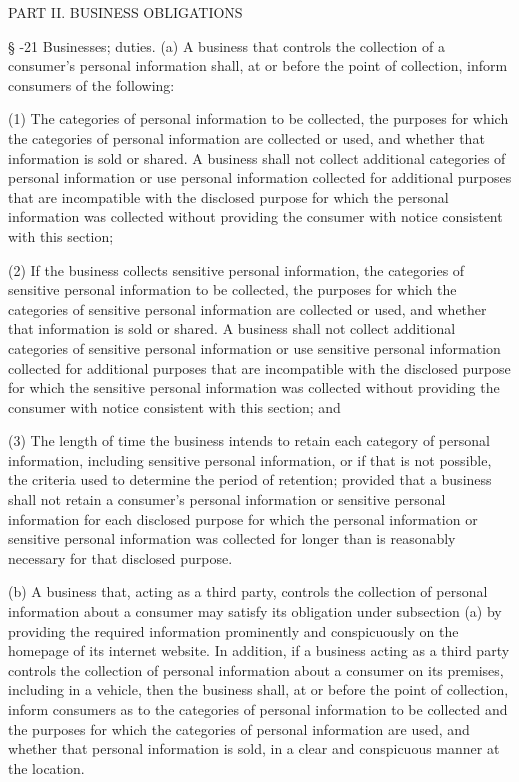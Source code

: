 PART II.  BUSINESS OBLIGATIONS

     §   -21  Businesses; duties.  (a) A business that controls the collection of a consumer's personal information shall, at or before the point of collection, inform consumers of the following:

     (1)  The categories of personal information to be collected, the purposes for which the categories of personal information are collected or used, and whether that information is sold or shared.  A business shall not collect additional categories of personal information or use personal information collected for additional purposes that are incompatible with the disclosed purpose for which the personal information was collected without providing the consumer with notice consistent with this section;

     (2)  If the business collects sensitive personal information, the categories of sensitive personal information to be collected, the purposes for which the categories of sensitive personal information are collected or used, and whether that information is sold or shared.  A business shall not collect additional categories of sensitive personal information or use sensitive personal information collected for additional purposes that are incompatible with the disclosed purpose for which the sensitive personal information was collected without providing the consumer with notice consistent with this section; and

     (3)  The length of time the business intends to retain each category of personal information, including sensitive personal information, or if that is not possible, the criteria used to determine the period of retention; provided that a business shall not retain a consumer's personal information or sensitive personal information for each disclosed purpose for which the personal information or sensitive personal information was collected for longer than is reasonably necessary for that disclosed purpose.

     (b)  A business that, acting as a third party, controls the collection of personal information about a consumer may satisfy its obligation under subsection (a) by providing the required information prominently and conspicuously on the homepage of its internet website.  In addition, if a business acting as a third party controls the collection of personal information about a consumer on its premises, including in a vehicle, then the business shall, at or before the point of collection, inform consumers as to the categories of personal information to be collected and the purposes for which the categories of personal information are used, and whether that personal information is sold, in a clear and conspicuous manner at the location.

